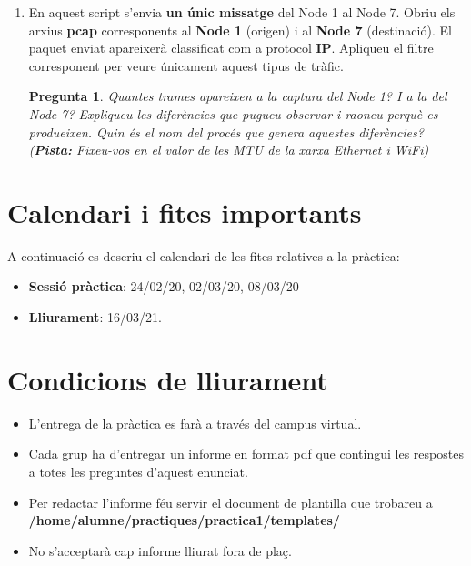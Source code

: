 \documentclass[12pt,a4paper]{article}
\newcounter{exercises}
\newtheorem{exer}[exercises]{Pregunta}
\begin{document}
\begin{enumerate}
\item En aquest script s'envia \textbf{un únic missatge} del Node 1 al Node 7. Obriu els arxius \textbf{pcap} corresponents al \textbf{Node 1} (origen) i al \textbf{Node 7} (destinació). El paquet enviat apareixerà classificat com a protocol \textbf{IP}. Apliqueu el filtre corresponent per veure únicament aquest tipus de tràfic.

\begin{exer} Quantes trames apareixen a la captura del Node 1? I a la del Node 7? Expliqueu les diferències que pugueu observar i raoneu perquè es produeixen. Quin és el nom del procés que genera aquestes diferències? (\textbf{Pista:} Fixeu-vos en el valor de les MTU de la xarxa Ethernet i WiFi)
\end{exer}

\end{enumerate}




\section{Calendari i fites importants}

A continuació es descriu el calendari de les fites relatives a la pràctica:

\begin{itemize}
    \item \textbf{Sessió pràctica}: 24/02/20, 02/03/20, 08/03/20
    \item \textbf{Lliurament}: 16/03/21.
\end{itemize}

\section{Condicions de lliurament}

\begin{itemize}
  \item L'entrega de la pràctica es farà a través del campus virtual.
  \item Cada grup ha d'entregar un informe en format pdf que contingui les respostes a totes les preguntes d'aquest enunciat.
  \item Per redactar l'informe féu servir el document de plantilla que trobareu a \newline
  \textbf{/home/alumne/practiques/practica1/templates/}
   \item No s'acceptarà cap informe lliurat fora de plaç.
\end{itemize}



\end{document}
